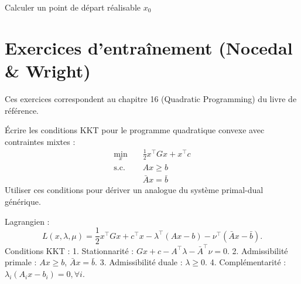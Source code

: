 \begin{algorithm}[H]
    \caption{Méthode du gradient projeté pour la Programmation Quadratique}
    \SetAlgoLined
    Calculer un point de départ réalisable $x_0$\;
\end{algorithm}

\section{Exercices d'entraînement (Nocedal \& Wright)}
\label{sec:11.exercises}

Ces exercices correspondent au chapitre 16 (Quadratic Programming) du livre de référence.

\bigskip
\begin{exercice}
Écrire les conditions KKT pour le programme quadratique convexe avec contraintes mixtes :
\begin{align*}
    \min_x \quad & \frac{1}{2} x^\top G x + x^\top c \\
    \text{s.c. } \quad & Ax \ge b \\
               & \bar{A}x = \bar{b}
\end{align*}
Utiliser ces conditions pour dériver un analogue du système primal-dual générique.
\end{exercice}

\begin{correction}
Lagrangien :
$$ L(x, \lambda, \mu) = \frac{1}{2}x^\top G x + c^\top x - \lambda^\top (Ax - b) - \nu^\top (\bar{A}x - \bar{b}). $$
Conditions KKT :
1. Stationnarité : $Gx + c - A^\top \lambda - \bar{A}^\top \nu = 0$.
2. Admissibilité primale : $Ax \ge b$, $\bar{A}x = \bar{b}$.
3. Admissibilité duale : $\lambda \ge 0$.
4. Complémentarité : $\lambda_i (A_i x - b_i) = 0, \forall i$.
\end{correction}
\bigskip

